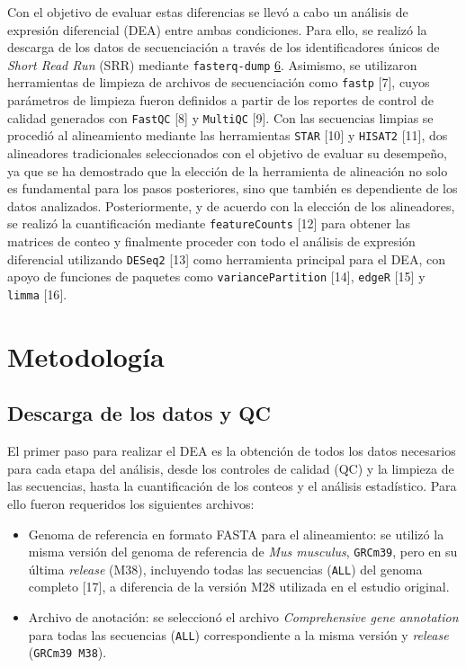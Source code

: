 \documentclass[
  10pt,
]{article}
\providecommand{\tightlist}{%
  \setlength{\itemsep}{0pt}\setlength{\parskip}{0pt}}
\begin{document}
Con el objetivo de evaluar estas diferencias se llevó a cabo un análisis
de expresión diferencial (DEA) entre ambas condiciones. Para ello, se
realizó la descarga de los datos de secuenciación a través de los
identificadores únicos de \emph{Short Read Run} (SRR) mediante
\texttt{fasterq-dump} \hyperref[section-5]{6}. Asimismo, se utilizaron
herramientas de limpieza de archivos de secuenciación como
\texttt{fastp} {[}7{]}, cuyos parámetros de limpieza fueron definidos a
partir de los reportes de control de calidad generados con
\texttt{FastQC} {[}8{]} y \texttt{MultiQC} {[}9{]}. Con las secuencias
limpias se procedió al alineamiento mediante las herramientas
\texttt{STAR} {[}10{]} y \texttt{HISAT2} {[}11{]}, dos alineadores
tradicionales seleccionados con el objetivo de evaluar su desempeño, ya
que se ha demostrado que la elección de la herramienta de alineación no
solo es fundamental para los pasos posteriores, sino que también es
dependiente de los datos analizados. Posteriormente, y de acuerdo con la
elección de los alineadores, se realizó la cuantificación mediante
\texttt{featureCounts} {[}12{]} para obtener las matrices de conteo y
finalmente proceder con todo el análisis de expresión diferencial
utilizando \texttt{DESeq2} {[}13{]} como herramienta principal para el
DEA, con apoyo de funciones de paquetes como \texttt{variancePartition}
{[}14{]}, \texttt{edgeR} {[}15{]} y \texttt{limma} {[}16{]}.

\section{Metodología}\label{metodologuxeda}

\subsection{Descarga de los datos y
QC}\label{descarga-de-los-datos-y-qc}

El primer paso para realizar el DEA es la obtención de todos los datos
necesarios para cada etapa del análisis, desde los controles de calidad
(QC) y la limpieza de las secuencias, hasta la cuantificación de los
conteos y el análisis estadístico. Para ello fueron requeridos los
siguientes archivos:

\begin{itemize}
\tightlist
\item
  Genoma de referencia en formato FASTA para el alineamiento: se utilizó
  la misma versión del genoma de referencia de \emph{Mus musculus},
  \texttt{GRCm39}, pero en su última \emph{release} (M38), incluyendo
  todas las secuencias (\texttt{ALL}) del genoma completo {[}17{]}, a
  diferencia de la versión M28 utilizada en el estudio original.
\item
  Archivo de anotación: se seleccionó el archivo \emph{Comprehensive
  gene annotation} para todas las secuencias (\texttt{ALL})
  correspondiente a la misma versión y \emph{release}
  (\texttt{GRCm39\ M38}).
\end{itemize}
\end{document}
